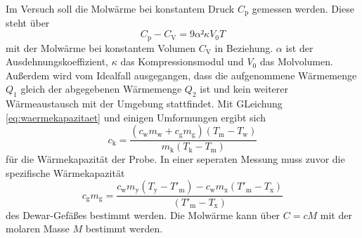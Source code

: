 Im Versuch soll die Molwärme bei konstantem Druck $C_\mathup{p}$ gemessen werden. Diese steht über
\begin{equation}
C_\mathup{p}-C_\mathup{V}=9{\alpha}²\kappa V_0 T
\end{equation}
mit der Molwärme bei konstantem Volumen $C_\mathup{V}$ in Beziehung. $\alpha$ ist der Ausdehnungskoeffizient, $\kappa$ das Kompressionsmodul und $V_0$ das Molvolumen.
Außerdem wird vom Idealfall ausgegangen, dass die aufgenommene Wärmemenge $Q_1$ gleich der abgegebenen Wärmemenge $Q_2$ ist und kein weiterer Wärmeaustausch mit der Umgebung stattfindet.
Mit GLeichung \eqref{eq:waermekapazitaet} und einigen Umformungen ergibt sich
\begin{equation}
c_\mathup{k}=\frac{(c_\mathup{w}m_\mathup{w}+c_\mathup{g}m_\mathup{g})(T_\mathup{m}-T_\mathup{w})}{m_\mathup{k}(T_\mathup{k}-T_\mathup{m})}
\end{equation}
für die Wärmekapazität der Probe. 
In einer seperaten Messung muss zuvor die spezifische Wärmekapazität 
\begin{equation}
c_\mathup{g}m_\mathup{g}=\frac{c_\mathup{w}m_\mathup{y}(T_\mathup{y}-T'_\mathup{m})-c_\mathup{w}m_\mathup{x}(T'_\mathup{m}-T_\mathup{x})}{(T'_\mathup{m}-T_\mathup{x})}
\end{equation}
des Dewar-Gefäßes bestimmt werden. 
Die Molwärme kann über $C=cM$ mit der molaren Masse $M$ bestimmt werden.



